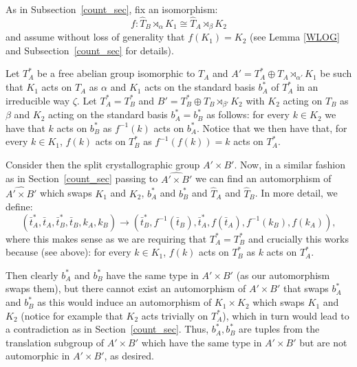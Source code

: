 \documentclass[a4paper, 11pt]{amsart}
\theoremstyle{definition}
\theoremstyle{remark}
\begin{document}
\smallskip \noindent

	 As in Subsection~\ref{count_sec}, fix an isomorphism:
$$f: \widehat{T}_B \rtimes_\alpha K_1 \cong \widehat{T}_A \rtimes_\beta K_2$$
and assume without loss of generality that $f(K_1) = K_2$ (see Lemma \ref{WLOG} and Subsection~\ref{count_sec} for details).

 \smallskip \noindent
 Let $T^*_A$ be a free abelian group isomorphic to $T_A$ and $A' = T^*_A \oplus T_A \rtimes_{\alpha'} K_1$ be such that $K_1$ acts on $T_A$ as $\alpha$ and $K_1$ acts on the standard basis $b^*_A$ of $T^*_A$ in an irreducible way $\zeta$. Let $T^*_A = T^*_B$ and $B' = T^*_B \oplus T_B \rtimes_{\beta'} K_2$ with $K_2$ acting on $T_B$ as $\beta$ and $K_2$ acting on the standard basis $b^*_A = b^*_B$ as follows: for every $k \in K_2$ we have that $k$ acts on $b^*_B$ as $f^{-1}(k)$ acts on $b^*_A$. Notice that we then have that, for every $k \in K_1$, $f(k)$ acts on $T^*_B$ as $f^{-1}(f(k)) = k$ acts on $T^*_A$.

 \smallskip \noindent
Consider then the split crystallographic group $A' \times B'$. Now, in a similar fashion as in Section~\ref{count_sec} passing to $\widehat{A' \times B'}$ we can find an automorphism of $\widehat{A' \times B'}$ which swaps $K_1$ and $K_2$, $b^*_A$ and $b^*_B$ and $\widehat{T}_A$ and $\widehat{T}_B$. In more detail, we define: 
\[(\bar{t}^*_A, \bar{t}_A, \bar{t}^*_B, \bar{t}_B, k_A, k_B) \rightarrow (\bar{t}^*_B, f^{-1}(\bar{t}_B), \bar{t}^*_A, f(\bar{t}_A), f^{-1}(k_B), f(k_A)),\]
where this makes sense as we are requiring that $T^*_A = T^*_B$ and crucially this works because (see above): for every $k \in K_1$, $f(k)$ acts on $T^*_B$ as $k$ acts on $T^*_A$.

\smallskip \noindent
Then clearly $b^*_A$ and $b^*_B$ have the same type in $A' \times B'$ (as our automorphism swaps them), but there cannot exist an automorphism of $A' \times B'$ that swaps $b^*_A$ and $b^*_B$ as this would induce an automorphism of $K_1 \times K_2$ which swaps $K_1$ and $K_2$ (notice for example that $K_2$ acts trivially on $T^*_A$), which in turn would lead to a contradiction as in Section~\ref{count_sec}. Thus, $b^*_A, b^*_B$ are tuples from the translation subgroup of $A' \times B'$ which have the same type in $A' \times B'$ but are not automorphic in $A' \times B'$, as desired.


\end{document}
